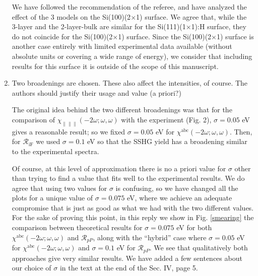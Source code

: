 \documentclass[11pt]{article}
\begin{document}
\begin{enumerate}
\begin{shaded}
We have followed the recommendation of the referee, and have analyzed the effect
of the 3 models on the Si(100)(2$\times$1) surface. We agree that, while the
3-layer and the 2-layer-bulk are similar for the Si(111)(1$\times$1):H  surface,
they do not coincide for the Si(100)(2$\times$1) surface. Since the
Si(100)(2$\times$1) surface is another case entirely with limited experimental
data available (without absolute units or covering a wide range of energy), we
consider that including results for this surface it is outside of the scope of
this manuscript.
\end{shaded}

\item
Two broadenings are chosen. These also affect the intensities, of course. The
authors should justify their usage and value (a priori?)
\begin{shaded}\label{ref1.08}
The original idea behind the two different broadenings was that for the
comparison of $\chi_{\parallel\parallel\parallel}(-2\omega;\omega,\omega)$ with
the experiment (Fig. 2), $\sigma=0.05$ eV gives a reasonable result; so we fixed
$\sigma=0.05$ eV for $\chi^{\mathrm{abc}}(-2\omega;\omega,\omega)$. Then, for
${\mathcal R}_{\mathrm{iF}}$ we used $\sigma=0.1$ eV so that the SSHG yield has
a broadening similar to the experimental spectra.

Of course, at this level of approximation there is no a priori value for
$\sigma$ other than trying to find a value that fits well to the experimental
results. We do agree that using two values for $\sigma$ is confusing, so we have
changed all the plots for a unique value of $\sigma=0.075$ eV, where we achieve
an  adequate compromise that is just as good as what we had with the two
different values. For the sake of proving this point, in this reply we show in
Fig. \ref{smearing} the comparison between theoretical results for
$\sigma=0.075$ eV for both $\chi^{\mathrm{abc}}(-2\omega;\omega,\omega)$ and
$\mathcal{R}_{pP}$, along with the ``hybrid'' case where $\sigma=0.05$ eV for
$\chi^{\mathrm{abc}}(-2\omega;\omega,\omega)$ and $\sigma=0.1$ eV for
$\mathcal{R}_{pP}$. We see that qualitatively both approaches give very similar
results. We have added a few sentences about our choice of $\sigma$ in the text
at the end of the Sec. IV, page 5.
\end{shaded}


\end{enumerate}
\end{document}
